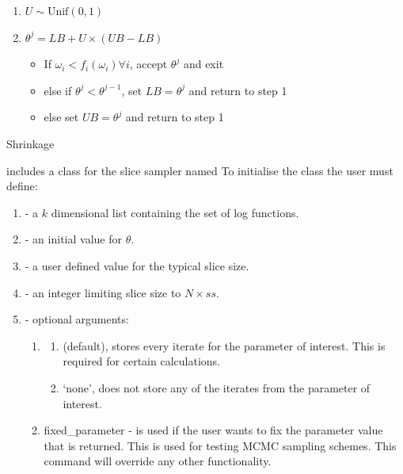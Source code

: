 \documentclass[article]{jss}
\begin{document}
%
\begin{algorithm}[H]
\begin{enumerate}
\item $U\sim\mbox{Unif}(0,1)$ 
\item $\theta^{j}=LB+U{\times}(UB-LB)$

\begin{itemize}
\item If $\omega_{i}<f_{i}(\omega_{i})\forall i$, accept $\theta^{j}$
and exit 
\item else if $\theta^{j}<\theta^{j-1}$, set $LB=\theta^{j}$ and return
to step 1 
\item else set $UB=\theta^{j}$ and return to step 1 
\end{itemize}
\end{enumerate}
\caption{Shrinkage}
\label{alg:shrinkage}
\end{algorithm}


 includes a class for the slice sampler named To initialise the class the user must define: 
\begin{enumerate}
 \item {} - a $k$ dimensional list containing the set of log functions. 
 \item {} - an initial value for $\theta$. 
 \item {} - a user defined value for the typical slice size. 
 \item {} - an integer limiting slice size to $N\times ss$.
 \item {} - optional arguments:
   
 \begin{enumerate}
   \item {}
     \begin{enumerate}
      \item {} (default), stores every iterate for the parameter of
        interest. This is required for certain calculations.
      \item `none', does not store any of the iterates from the parameter of interest. 
     \end{enumerate}
   \item fixed\_parameter - is used if the user wants to fix the
     parameter value that is returned. This is used for testing MCMC
     sampling schemes.  This command will override any other
     functionality.
  \end{enumerate}
\end{enumerate}
\end{document}
